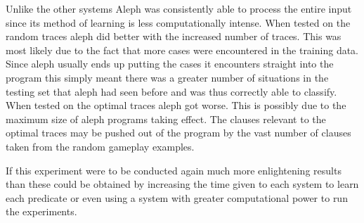 Unlike the other systems Aleph was consistently able to process the entire input since its method of learning is less computationally intense. When tested on the random traces aleph did better with the increased number of traces. This was most likely due to the fact that more cases were encountered in the training data. Since aleph usually ends up putting the cases it encounters straight into the program this simply meant there was a greater number of situations in the testing set that aleph had seen before and was thus correctly able to classify. When tested on the optimal traces aleph got worse. This is possibly due to the maximum size of aleph programs taking effect. The clauses relevant to the optimal traces may be pushed out of the program by the vast number of clauses taken from the random gameplay examples.

If this experiment were to be conducted again much more enlightening results than these could be obtained by increasing the time given to each system to learn each predicate or even using a system with greater computational power to run the experiments. 

